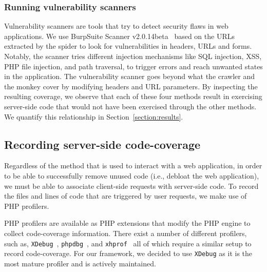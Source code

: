 
\subsubsection{Running vulnerability scanners}
Vulnerability scanners are tools that try to detect security flaws in web applications.
We use BurpSuite Scanner v2.0.14beta~\cite{burpsuite} based on the URLs extracted by the spider to look for vulnerabilities in headers, URLs and forms.
Notably, the scanner tries different injection mechanisms like SQL injection, XSS, PHP file injection, and path traversal, to trigger errors and reach unwanted states in the application.
The vulnerability scanner goes beyond what the crawler and the monkey cover by modifying headers and URL parameters.
By inspecting the resulting coverage, we observe that each of these four methods result in exercising server-side code that would not have been exercised through the other methods. We quantify this relationship in Section~\ref{section:results}.


\subsection{Recording server-side code-coverage}
\label{subsec:coverage}

Regardless of the method that is used to interact with a web application,
in order to be able to successfully remove unused code (i.e., debloat the web
application), we must be able to
associate client-side requests with server-side code. To record the files
and lines of code that are triggered by user requests, we make use of PHP
profilers.

PHP profilers are available as PHP extensions that modify the PHP engine to
collect code-coverage information. There exist a number of different profilers,
such as, \texttt{XDebug}~\cite{XDebug}, \texttt{phpdbg}~\cite{phpdbg}, and
\texttt{xhprof}~\cite{xhprof} all of which require a similar setup to record
code-coverage. For our framework, we decided to use \texttt{XDebug} as it
is the most mature profiler and is actively maintained.

